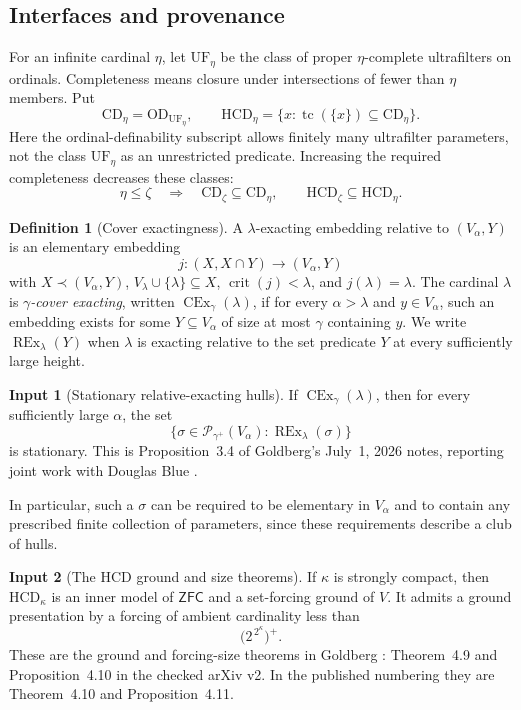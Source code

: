 \documentclass[11pt,letterpaper]{article}
\theoremstyle{definition}
\newtheorem{definition}{Definition}[section]
\newtheorem{inputthm}{Input}
\numberwithin{equation}{section}
\newcommand{\ZFC}{\mathsf{ZFC}}
\newcommand{\OD}{\mathrm{OD}}
\newcommand{\CD}{\mathrm{CD}}
\newcommand{\HCD}{\mathrm{HCD}}
\newcommand{\UF}{\mathrm{UF}}
\newcommand{\CEx}{\operatorname{CEx}}
\newcommand{\REx}{\operatorname{REx}}
\newcommand{\crit}{\operatorname{crit}}
\newcommand{\Pow}{\mathcal P}
\newcommand{\tc}{\operatorname{tc}}
\begin{document}
\subsection{Interfaces and provenance}

For an infinite cardinal $\eta$, let $\UF_\eta$ be the class of proper $\eta$-complete ultrafilters on ordinals. Completeness means closure under intersections of fewer than $\eta$ members. Put
\[
\CD_\eta=\OD_{\UF_\eta},\qquad
\HCD_\eta=\{x:\tc(\{x\})\subseteq\CD_\eta\}.
\]
Here the ordinal-definability subscript allows finitely many ultrafilter parameters, not the class $\UF_\eta$ as an unrestricted predicate. Increasing the required completeness decreases these classes:
\begin{equation}\label{eq:monotone}
\eta\le\zeta\quad\Longrightarrow\quad
\CD_\zeta\subseteq\CD_\eta,
\qquad\HCD_\zeta\subseteq\HCD_\eta.
\end{equation}

\begin{definition}[Cover exactingness]
A $\lambda$-exacting embedding relative to $(V_\alpha,Y)$ is an elementary embedding
\[
j:(X,X\cap Y)\longrightarrow(V_\alpha,Y)
\]
with $X\prec(V_\alpha,Y)$, $V_\lambda\cup\{\lambda\}\subseteq X$, $\crit(j)<\lambda$, and $j(\lambda)=\lambda$.
The cardinal $\lambda$ is \emph{$\gamma$-cover exacting}, written $\CEx_\gamma(\lambda)$, if for every $\alpha>\lambda$ and $y\in V_\alpha$, such an embedding exists for some $Y\subseteq V_\alpha$ of size at most $\gamma$ containing $y$.
We write $\REx_\lambda(Y)$ when $\lambda$ is exacting relative to the set predicate $Y$ at every sufficiently large height.
\end{definition}

\begin{inputthm}[Stationary relative-exacting hulls]\label{in:cover}
If $\CEx_\gamma(\lambda)$, then for every sufficiently large $\alpha$, the set
\[
\{\sigma\in\Pow_{\gamma^+}(V_\alpha):\REx_\lambda(\sigma)\}
\]
is stationary. This is Proposition~3.4 of Goldberg's July~1, 2026 notes, reporting joint work with Douglas Blue \cite{cover}.
\end{inputthm}

In particular, such a $\sigma$ can be required to be elementary in $V_\alpha$ and to contain any prescribed finite collection of parameters, since these requirements describe a club of hulls.

\begin{inputthm}[The HCD ground and size theorems]\label{in:ground}
If $\kappa$ is strongly compact, then $\HCD_\kappa$ is an inner model of $\ZFC$ and a set-forcing ground of $V$. It admits a ground presentation by a forcing of ambient cardinality less than
\[
\bigl(2^{\,2^\kappa}\bigr)^+.
\]
These are the ground and forcing-size theorems in Goldberg \cite{goldberg}: Theorem~4.9 and Proposition~4.10 in the checked arXiv v2. In the published numbering they are Theorem~4.10 and Proposition~4.11.
\end{inputthm}
\end{document}
